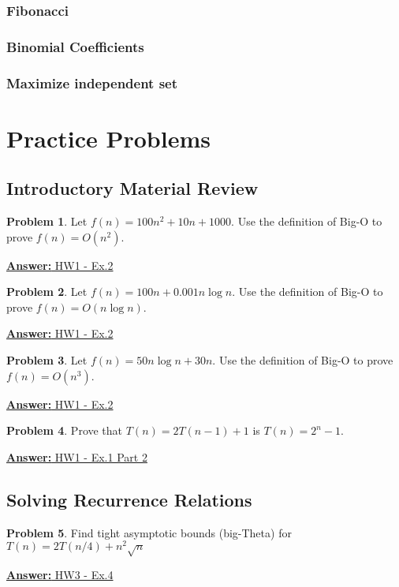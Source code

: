 \documentclass[12pt]{article}
\theoremstyle{definition}
\newtheorem{practiceproblem}{Problem}[section]
\def\scratchwork{\vspace*{15em}} %
\def\psetone{https://github.com/zacktraczyk/CSE102-Midterm-Study-Guide/blob/main/hw\%20answers/vaggos\_W\_24\_CSE102\_01\_PSET\_1\_solutions.pdf}
\def\psetthree{https://github.com/zacktraczyk/CSE102-Midterm-Study-Guide/blob/main/hw\%20answers/vaggos\_W\_24\_CSE102\_01\_PSET\_3\_solutions.pdf}
\newenvironment{problem}[2]
{
	\def\linktext{#1}
	\def\linkdest{#2}
	\noindent \begin{minipage}{\textwidth}
		\begin{practiceproblem}
}
{	
		\end{practiceproblem}
		\href{\linkdest}{\textbf{Answer:} \linktext}
		\scratchwork
	\end{minipage}
}
\begin{document}
	\subsubsection{Fibonacci}

	\subsubsection{Binomial Coefficients}

	\subsubsection{Maximize independent set}


	\section{Practice Problems}

	\subsection{Introductory Material Review}

	\begin{problem}{HW1 - Ex.2}{\psetone}
		Let	$f(n)=100n^2 +10n+1000$. Use the definition of Big-O to prove
		$f(n)=O(n^2)$.
	\end{problem}

	\begin{problem}{HW1 - Ex.2}{\psetone}
		Let $f(n)=100n + 0.001n\log n$. Use the definition of Big-O to prove
		$f(n)=O(n\log n)$.
	\end{problem}

	\begin{problem}{HW1 - Ex.2}{\psetone}
		Let $f(n)=50n\log n + 30n$. Use the definition of Big-O to prove
		$f(n)=O(n^3)$.
	\end{problem}

	\begin{problem}{HW1 - Ex.1 Part 2}{\psetone}
		Prove that $T(n) = 2T(n - 1) + 1$ is $T(n) = 2^n - 1$.
	\end{problem}


	\subsection{Solving Recurrence Relations}


	\begin{problem}{HW3 - Ex.4}{\psetthree}
		Find tight asymptotic bounds (big-Theta) for $T(n)=2T(n/4)+n^2\sqrt n$
	\end{problem}
\end{document}
